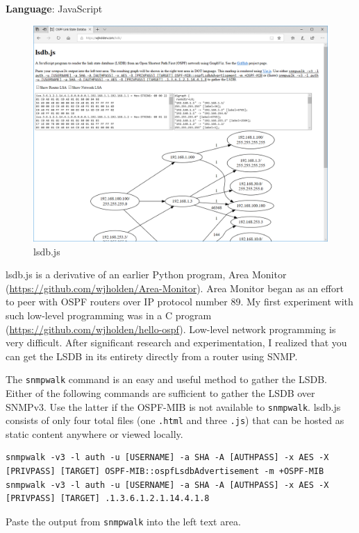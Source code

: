 \documentclass[12pt]{article}
\begin{document}
\textbf{Language}: JavaScript

\begin{figure}[h]
\centering
\includegraphics[width=\textwidth]{lsdb.PNG}
\caption{lsdb.js}
\label{fig:lsdb}
\end{figure}

lsdb.js is a derivative of an earlier Python program, Area Monitor (\url{https://github.com/wjholden/Area-Monitor}). Area Monitor began as an effort to peer with OSPF routers over IP protocol number 89. My first experiment with such low-level programming was in a C program (\url{https://github.com/wjholden/hello-ospf}). Low-level network programming is very difficult. After significant research and experimentation, I realized that you can get the LSDB in its entirety directly from a router using SNMP.

The \texttt{snmpwalk} command is an easy and useful method to gather the LSDB. Either of the following commands are sufficient to gather the LSDB over SNMPv3. Use the latter if the OSPF-MIB is not available to \texttt{snmpwalk}. lsdb.js consists of only four total files (one \texttt{.html} and three \texttt{.js}) that can be hosted as static content anywhere or viewed locally.

\begin{lstlisting}
snmpwalk -v3 -l auth -u [USERNAME] -a SHA -A [AUTHPASS] -x AES -X [PRIVPASS] [TARGET] OSPF-MIB::ospfLsdbAdvertisement -m +OSPF-MIB
snmpwalk -v3 -l auth -u [USERNAME] -a SHA -A [AUTHPASS] -x AES -X [PRIVPASS] [TARGET] .1.3.6.1.2.1.14.4.1.8
\end{lstlisting}

Paste the output from \texttt{snmpwalk} into the left text area.
\end{document}
